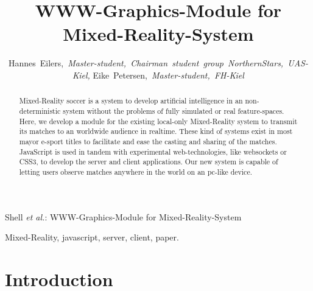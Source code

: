 \documentclass[journal]{IEEEtran}
\begin{document}
\title{WWW-Graphics-Module for Mixed-Reality-System}

\author{Hannes~Eilers,~\textit{Master-student,~Chairman~student~group~NorthernStars,~UAS-Kiel,}
Eike~Petersen,~\textit{Master-student,~FH-Kiel}}

%
{Shell \MakeLowercase{\textit{et al.}}: WWW-Graphics-Module for Mixed-Reality-System}

\maketitle

\begin{abstract}
Mixed-Reality soccer is a system to develop artificial intelligence in an non-deterministic system without the problems of fully simulated or real feature-spaces. Here, we develop a module for the existing local-only Mixed-Reality system to transmit its matches to an worldwide audience in realtime. These kind of systems exist in most mayor e-sport titles\cite{counter-strike,starcraft2,dota2,waaaghtv} to facilitate and ease the casting and sharing of the matches. JavaScript is used in tandem with experimental web-technologies, like websockets or CSS3, to develop the server and client applications. Our new system is capable of letting users observe matches anywhere in the world on an pc-like device.
\end{abstract}
\begin{IEEEkeywords}
Mixed-Reality, javascript, server, client, paper.
\end{IEEEkeywords}

\section{Introduction}
\end{document}
